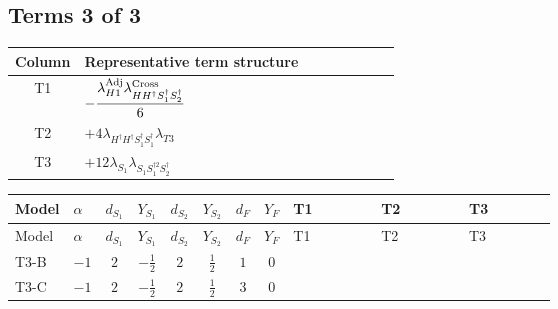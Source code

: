 \documentclass[8pt]{article}
\begin{document}
\begin{landscape}
\subsection*{Terms 3 of 3}
\begin{center}
\begin{tabular}{@{}c >{\raggedright\arraybackslash}p{0.82\linewidth}@{}}
\toprule
Column & Representative term structure \\
\midrule
T1 & \(\displaystyle -\frac{{\lambda_{H1}^{\rm Adj}} {\lambda_{H H^\dagger S_1^\dagger S_2^\dagger}^{\rm Cross}}}{6}\) \\
\midrule
T2 & \(\displaystyle +4 {\lambda_{H^\dagger H^\dagger S_1^\dagger S_1^\dagger}} {\lambda_{T3}}\) \\
\midrule
T3 & \(\displaystyle +12 {\lambda_{S_1}} {\lambda_{S_1 S_1^{\dagger 2}S_2^\dagger}}\) \\
\midrule
\bottomrule
\end{tabular}
\end{center}
\smallskip
\tiny
\begin{longtable}{@{}llcccccc >{\raggedright\arraybackslash}p{0.21\linewidth} >{\raggedright\arraybackslash}p{0.21\linewidth} >{\raggedright\arraybackslash}p{0.21\linewidth}@{}}
\toprule
Model & $\alpha$ & $d_{S_1}$ & $Y_{S_1}$ & $d_{S_2}$ & $Y_{S_2}$ & $d_F$ & $Y_F$ & T1 & T2 & T3 \\
\midrule
\endfirsthead
\toprule
Model & $\alpha$ & $d_{S_1}$ & $Y_{S_1}$ & $d_{S_2}$ & $Y_{S_2}$ & $d_F$ & $Y_F$ & T1 & T2 & T3 \\
\midrule
\endhead
T3-B & $-1$ & $2$ & $-\frac{1}{2}$ & $2$ & $\frac{1}{2}$ & $1$ & $0$ & \scriptsize\adjustbox{max width=\linewidth}{$\begin{gathered} -\frac{{\lambda_{H1}^{\rm Adj}} {\lambda_{H H^\dagger S_1^\dagger S_2^\dagger}^{\rm Cross}}}{6}\end{gathered}$} & \scriptsize\adjustbox{max width=\linewidth}{$\begin{gathered} +4 {\lambda_{H^\dagger H^\dagger S_1^\dagger S_1^\dagger}} {\lambda_{T3}}\end{gathered}$} & \scriptsize\adjustbox{max width=\linewidth}{$\begin{gathered} +12 {\lambda_{S_1}} {\lambda_{S_1 S_1^{\dagger 2}S_2^\dagger}}\end{gathered}$} \\
\midrule
T3-C & $-1$ & $2$ & $-\frac{1}{2}$ & $2$ & $\frac{1}{2}$ & $3$ & $0$ & \scriptsize\adjustbox{max width=\linewidth}{$\begin{gathered} -\frac{{\lambda_{H1}^{\rm Adj}} {\lambda_{H H^\dagger S_1^\dagger S_2^\dagger}^{\rm Cross}}}{6}\end{gathered}$} & \scriptsize\adjustbox{max width=\linewidth}{$\begin{gathered} +4 {\lambda_{H^\dagger H^\dagger S_1^\dagger S_1^\dagger}} {\lambda_{T3}}\end{gathered}$} & \scriptsize\adjustbox{max width=\linewidth}{$\begin{gathered} +12 {\lambda_{S_1}} {\lambda_{S_1 S_1^{\dagger 2}S_2^\dagger}}\end{gathered}$} \\

\end{longtable}
\end{landscape}
\end{document}
